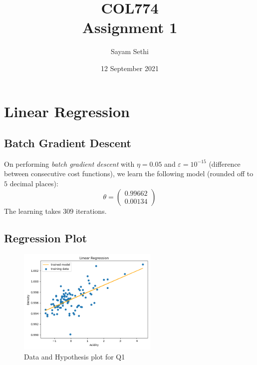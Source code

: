 \documentclass[11pt]{article}
\title{COL774\\Assignment 1}
\author{Sayam Sethi}
\date{12 September 2021}
\begin{document}
\maketitle

\tableofcontents

\section{Linear Regression}

\subsection{Batch Gradient Descent}
On performing \textit{batch gradient descent} with $\eta=0.05$ and $\varepsilon=10^{-15}$ (difference between consecutive cost functions), we learn the following model (rounded off to $5$ decimal places):
\begin{equation}
    \theta=
    \begin{pmatrix}
        0.99662\\
        0.00134
    \end{pmatrix}
\end{equation}
The learning takes $309$ iterations.

\subsection{Regression Plot}
\begin{figure}[H]
    \centering
    \includegraphics[width=0.6\textwidth]{Q1/output/b.png}
    \caption{Data and Hypothesis plot for Q1}
\end{figure}
\end{document}
